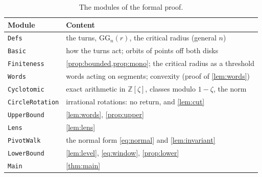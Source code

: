 \documentclass[11pt,a4paper]{article}
\newcommand{\Z}{\mathbb{Z}}
\newcommand{\GG}{\mathrm{GG}}
\begin{document}
\begin{table}[h]
  \centering\small
  \begin{tabularx}{\textwidth}{@{}lX@{}}
    \toprule
    Module & Content \\
    \midrule
    \texttt{Defs} & the turns, $\GG_n(r)$, the critical radius (general $n$) \\
    \texttt{Basic} & how the turns act; orbits of points off both disks \\
    \texttt{Finiteness} & \cref{prop:bounded,prop:mono}; the critical radius as a threshold \\
    \texttt{Words} & words acting on segments; convexity (proof of \cref{lem:words}) \\
    \texttt{Cyclotomic} & exact arithmetic in $\Z[\zeta]$, classes modulo $1-\zeta$, the norm \\
    \texttt{CircleRotation} & irrational rotations: no return, and \cref{lem:cut} \\
    \texttt{UpperBound} & \cref{lem:words}, \cref{prop:upper} \\
    \texttt{Lens} & \cref{lem:lens} \\
    \texttt{PivotWalk} & the normal form \eqref{eq:normal} and \cref{lem:invariant} \\
    \texttt{LowerBound} & \cref{lem:level}, \eqref{eq:window}, \cref{prop:lower} \\
    \texttt{Main} & \cref{thm:main} \\
    \bottomrule
  \end{tabularx}
  \caption{The modules of the formal proof.}
  \label{tab:modules}
\end{table}
\end{document}
